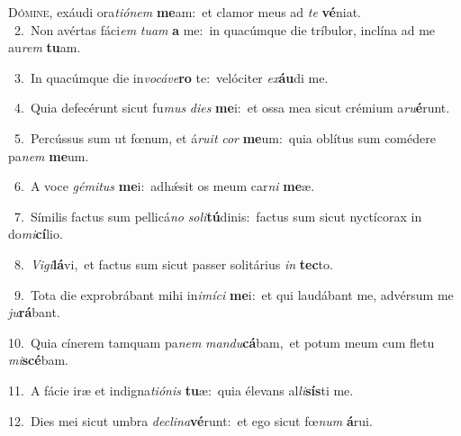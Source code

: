 \lettrine{\initial\textcolor{\initialcolor}{D}}{ómine,} exáudi ora\-\textit{ti}\-\textit{ó}\textit{nem} \textbf{me}\-am:~\star et clamor meus ad \textit{te} \textbf{vé}\-niat.\\
{\numbfont\textcolor{\numbcolor}{~2.}}~Non avértas fáci\textit{em} \textit{tu}\-\textit{am} \textbf{a} me:~\star in quacúmque die tríbulor, inclína ad me au\textit{rem} \textbf{tu}\-am.\par
{\numbfont\textcolor{\numbcolor}{~3.}}~In quacúmque die in\-\textit{vo}\-\textit{cá}\textit{ve}\textbf{ro} te:~\star velóciter \textit{ex}\-\textbf{áu}di me.\par
{\numbfont\textcolor{\numbcolor}{~4.}}~Quia defecérunt sicut fu\textit{mus} \textit{di}\-\textit{es} \textbf{me}\-i:~\star et ossa mea sicut crémium a\-\textit{ru}\-\textbf{é}runt.\par
{\numbfont\textcolor{\numbcolor}{~5.}}~Percússus sum ut fœnum, et á\-\textit{ru}\-\textit{it} \textit{cor} \textbf{me}\-um:~\star quia oblítus sum comédere pa\textit{nem} \textbf{me}\-um.\par
{\numbfont\textcolor{\numbcolor}{~6.}}~A voce \textit{gé}\-\textit{mi}\textit{tus} \textbf{me}\-i:~\star adhǽsit os meum car\textit{ni} \textbf{me}\-æ.\par
{\numbfont\textcolor{\numbcolor}{~7.}}~Símilis factus sum pellicá\textit{no} \textit{so}\-\textit{li}\textbf{tú}dinis:~\star factus sum sicut nyctícorax in do\-\textit{mi}\-\textbf{cí}lio.\par
{\numbfont\textcolor{\numbcolor}{~8.}}~\-\textit{Vi}\-\textit{gi}\textbf{lá}vi,~\star et factus sum sicut passer solitárius \textit{in} \textbf{tec}\-to.\par
{\numbfont\textcolor{\numbcolor}{~9.}}~Tota die exprobrábant mihi in\-\textit{i}\-\textit{mí}\textit{ci} \textbf{me}\-i:~\star et qui laudábant me, advérsum me \textit{ju}\-\textbf{rá}bant.\par
{\numbfont\textcolor{\numbcolor}{10.}}~Quia cínerem tamquam pa\textit{nem} \textit{man}\-\textit{du}\textbf{cá}bam,~\star et potum meum cum fletu \textit{mi}\-\textbf{scé}bam.\par
{\numbfont\textcolor{\numbcolor}{11.}}~A fácie iræ et indigna\-\textit{ti}\-\textit{ó}\textit{nis} \textbf{tu}\-æ:~\star quia élevans al\-\textit{li}\-\textbf{sís}ti me.\par
{\numbfont\textcolor{\numbcolor}{12.}}~Dies mei sicut umbra \textit{de}\-\textit{cli}\textit{na}\textbf{vé}runt:~\star et ego sicut fœ\textit{num} \textbf{á}\-rui.\par
